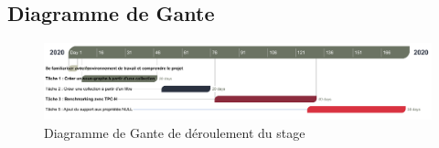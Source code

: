 \subsection{Diagramme de Gante}
\begin{figure}[h!]  
  \centering
    \includegraphics[width=1.2\textwidth]{chapitre1/Figures/PlanningRoadmap.png}
  \caption{Diagramme de Gante de déroulement du stage}
\end{figure}